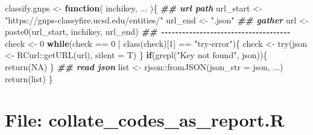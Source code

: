 \documentclass[
]{article}
\newenvironment{Shaded}{\begin{snugshade}}{\end{snugshade}}
\newcommand{\AttributeTok}[1]{\textcolor[rgb]{0.77,0.63,0.00}{#1}}
\newcommand{\ConstantTok}[1]{\textcolor[rgb]{0.00,0.00,0.00}{#1}}
\newcommand{\ControlFlowTok}[1]{\textcolor[rgb]{0.13,0.29,0.53}{\textbf{#1}}}
\newcommand{\DecValTok}[1]{\textcolor[rgb]{0.00,0.00,0.81}{#1}}
\newcommand{\DocumentationTok}[1]{\textcolor[rgb]{0.56,0.35,0.01}{\textbf{\textit{#1}}}}
\newcommand{\FunctionTok}[1]{\textcolor[rgb]{0.00,0.00,0.00}{#1}}
\newcommand{\NormalTok}[1]{#1}
\newcommand{\OtherTok}[1]{\textcolor[rgb]{0.56,0.35,0.01}{#1}}
\newcommand{\SpecialCharTok}[1]{\textcolor[rgb]{0.00,0.00,0.00}{#1}}
\newcommand{\StringTok}[1]{\textcolor[rgb]{0.31,0.60,0.02}{#1}}
\begin{document}
\begin{Shaded}
\begin{Highlighting}[]
\NormalTok{classify.gnps }\OtherTok{\textless{}{-}} 
  \ControlFlowTok{function}\NormalTok{(}
\NormalTok{           inchikey,}
\NormalTok{           ...}
\NormalTok{           )\{}
    \DocumentationTok{\#\# url path}
\NormalTok{    url\_start }\OtherTok{\textless{}{-}} \StringTok{"https://gnps{-}classyfire.ucsd.edu/entities/"}
\NormalTok{    url\_end }\OtherTok{\textless{}{-}} \StringTok{".json"}
    \DocumentationTok{\#\# gather}
\NormalTok{    url }\OtherTok{\textless{}{-}} \FunctionTok{paste0}\NormalTok{(url\_start, inchikey, url\_end)}
    \DocumentationTok{\#\# {-}{-}{-}{-}{-}{-}{-}{-}{-}{-}{-}{-}{-}{-}{-}{-}{-}{-}{-}{-}{-}{-}{-}{-}{-}{-}{-}{-}{-}{-}{-}{-}{-}{-}{-}{-}{-} }
\NormalTok{    check }\OtherTok{\textless{}{-}} \DecValTok{0}
    \ControlFlowTok{while}\NormalTok{(check }\SpecialCharTok{==} \DecValTok{0} \SpecialCharTok{|} \FunctionTok{class}\NormalTok{(check)[}\DecValTok{1}\NormalTok{] }\SpecialCharTok{==} \StringTok{"try{-}error"}\NormalTok{)\{}
\NormalTok{      check }\OtherTok{\textless{}{-}} \FunctionTok{try}\NormalTok{(json }\OtherTok{\textless{}{-}}\NormalTok{ RCurl}\SpecialCharTok{::}\FunctionTok{getURL}\NormalTok{(url), }\AttributeTok{silent =}\NormalTok{ T)}
\NormalTok{    \}}
    \ControlFlowTok{if}\NormalTok{(}\FunctionTok{grepl}\NormalTok{(}\StringTok{"Key not found"}\NormalTok{, json))\{}
      \FunctionTok{return}\NormalTok{(}\ConstantTok{NA}\NormalTok{)}
\NormalTok{    \}}
    \DocumentationTok{\#\# read json}
\NormalTok{    list }\OtherTok{\textless{}{-}}\NormalTok{ rjson}\SpecialCharTok{::}\FunctionTok{fromJSON}\NormalTok{(}\AttributeTok{json\_str =}\NormalTok{ json, ...)}
    \FunctionTok{return}\NormalTok{(list)}
\NormalTok{  \}}
\end{Highlighting}
\end{Shaded}

\hypertarget{file-collate_codes_as_report.r}{%
\section{File: collate\_codes\_as\_report.R}\label{file-collate_codes_as_report.r}}
\end{document}
